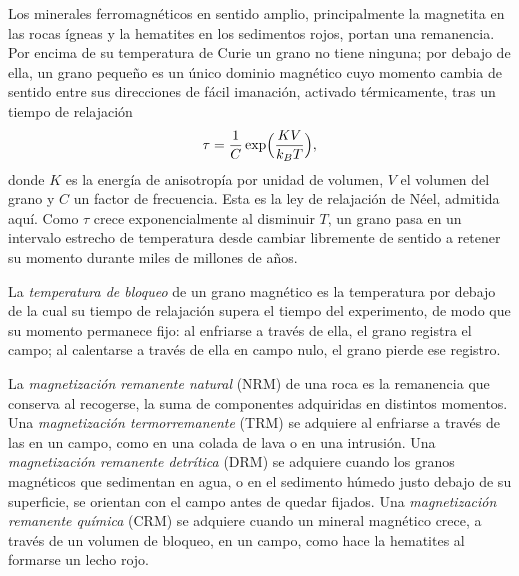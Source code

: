 Los minerales ferromagnéticos en sentido amplio, principalmente la magnetita en las rocas ígneas
y la hematites en los sedimentos rojos, portan una remanencia. Por encima de su temperatura de Curie
un grano no tiene ninguna; por debajo de ella, un grano pequeño es un único dominio magnético cuyo
momento cambia de sentido entre sus direcciones de fácil imanación, activado térmicamente, tras un
tiempo de relajación
\[
  \tau = \frac1C\exp\Bigl(\frac{K V}{k_B T}\Bigr),
\]
donde $K$ es la energía de anisotropía por unidad de volumen, $V$ el volumen del grano
y $C$ un factor de frecuencia. Esta es la ley de relajación de Néel, admitida aquí. Como
$\tau$ crece exponencialmente al disminuir $T$, un grano pasa en un intervalo estrecho
de temperatura desde cambiar libremente de sentido a retener su momento durante miles de millones de
años.

\begin{definition}\label{def:b3:palaeomagnetism:blocking}
La \emph{temperatura de bloqueo} de un grano magnético
es la temperatura por debajo de la cual su tiempo de relajación supera el tiempo del
experimento, de modo que su momento permanece fijo: al enfriarse a través de ella, el grano
registra el campo; al calentarse a través de ella en campo nulo, el grano pierde ese
registro.
\end{definition}

\begin{definition}\label{def:b3:palaeomagnetism:nrm}
La \emph{magnetización remanente natural}
(NRM) de una roca es la remanencia que conserva al recogerse, la suma de
componentes adquiridas en distintos momentos. Una \emph{magnetización
termorremanente} (TRM) se adquiere al enfriarse
a través de las  en un campo, como en una colada de lava o en una
intrusión. Una \emph{magnetización remanente detrítica}
(DRM) se adquiere cuando los granos magnéticos que sedimentan en agua, o en
el sedimento húmedo justo debajo de su superficie, se orientan con el campo antes de
quedar fijados. Una \emph{magnetización remanente química}
(CRM) se adquiere cuando un mineral magnético crece, a través de un
volumen de bloqueo, en un campo, como hace la hematites al formarse un lecho rojo.
\end{definition}

